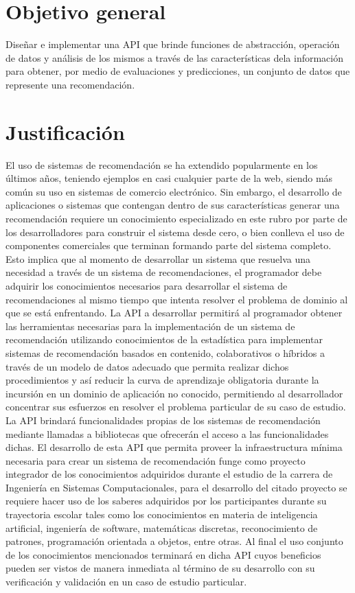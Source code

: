  \section {Objetivo general}
    Diseñar e implementar una API que brinde funciones de abstracción, operación de datos y análisis de los mismos a través de las características dela información para obtener, por medio de evaluaciones y predicciones, un conjunto de datos que represente una recomendación.

  \section{Justificación}
    El uso de sistemas de recomendación se ha extendido popularmente en los últimos años, teniendo ejemplos en casi cualquier parte de la web, siendo más común su uso en sistemas de comercio electrónico. Sin embargo, el desarrollo de aplicaciones o sistemas que contengan dentro de sus características generar una recomendación requiere un conocimiento especializado en este rubro por parte de los desarrolladores para construir el sistema desde cero, o bien conlleva el uso de componentes comerciales que terminan formando parte del sistema completo. Esto implica que al momento de desarrollar un sistema que resuelva una necesidad a través de un sistema de recomendaciones, el programador debe adquirir los conocimientos necesarios para desarrollar el sistema de recomendaciones al mismo tiempo que intenta resolver el problema de dominio al que se está enfrentando. La API a desarrollar permitirá al programador obtener las herramientas necesarias para la implementación de un sistema de recomendación utilizando conocimientos de la estadística para implementar sistemas de recomendación basados en contenido, colaborativos o híbridos a través de un modelo de datos adecuado que permita realizar dichos procedimientos y así reducir la curva de aprendizaje obligatoria durante la incursión en un dominio de aplicación no conocido, permitiendo al desarrollador concentrar sus esfuerzos en resolver el problema particular de su caso de estudio. \\

    La API brindará funcionalidades propias de los sistemas de recomendación mediante llamadas a bibliotecas que ofrecerán el acceso a las funcionalidades dichas. El desarrollo de esta API que permita proveer la infraestructura mínima necesaria para crear un sistema de recomendación funge como proyecto integrador de los conocimientos adquiridos durante el estudio de la carrera de Ingeniería en Sistemas Computacionales, para el desarrollo del citado proyecto se requiere hacer uso de los saberes adquiridos por los participantes durante su trayectoria escolar tales como los conocimientos en materia de inteligencia artificial, ingeniería de software, matemáticas discretas, reconocimiento de patrones, programación orientada a objetos, entre otras. Al final el uso conjunto de los conocimientos mencionados terminará en dicha API cuyos beneficios pueden ser vistos de manera inmediata al término de su desarrollo con su verificación y validación en un caso de estudio particular.
